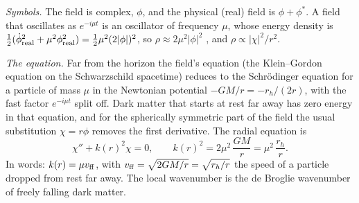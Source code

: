\emph{Symbols.} The field is complex, $\phi$, and the physical (real) field is $\phi+\phi^*$. A field that oscillates as $e^{-i\mu t}$ is an oscillator of frequency $\mu$, whose energy density is $\tfrac12(\dot\phi_{\rm real}^2+\mu^2\phi_{\rm real}^2)=\tfrac12\mu^2(2\lvert\phi\rvert)^2$, so $\rho\approx2\mu^2\lvert\phi\rvert^2$ \cite[eq.~(2.12)]{HuiKabat2019}, and $\rho\propto\lvert\chi\rvert^2/r^2$.

\emph{The equation.} Far from the horizon the field's equation (the Klein--Gordon equation on the Schwarzschild spacetime) reduces to the Schr\"odinger equation for a particle of mass $\mu$ in the Newtonian potential $-GM/r=-r_h/(2r)$, with the fast factor $e^{-i\mu t}$ split off. Dark matter that starts at rest far away has zero energy in that equation, and for the spherically symmetric part of the field the usual substitution $\chi=r\phi$ removes the first derivative. The radial equation is
\begin{equation}
  \chi''+k(r)^2\chi=0,\qquad k(r)^2=2\mu^2\,\frac{GM}{r}=\mu^2\,\frac{r_h}{r} .
  \label{T2a:eq:kg-radial}
\end{equation}
In words: $k(r)=\mu v_{\rm ff}$, with $v_{\rm ff}=\sqrt{2GM/r}=\sqrt{r_h/r}$ the speed of a particle dropped from rest far away. The local wavenumber is the de Broglie wavenumber of freely falling dark matter.

